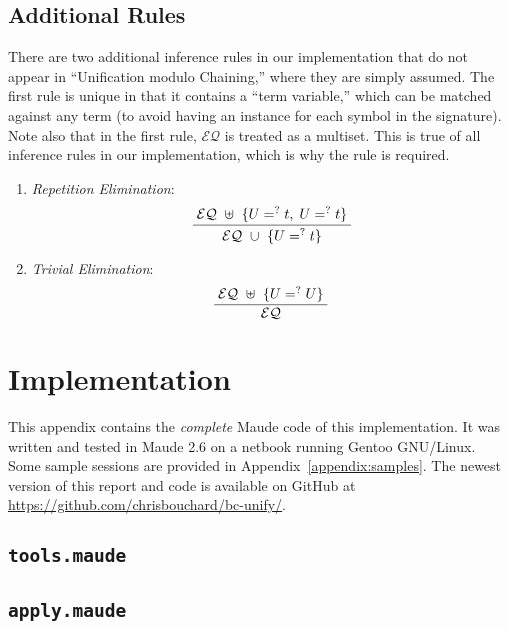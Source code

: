 \documentclass[11pt,twoside,titlepage]{article}
\newcommand{\ueq}{=_{}^?}
\newcommand{\EQ}{\mathcal{EQ}}
\newcommand{\TitleListing}[1]{\texorpdfstring{\lstinline|#1|}{#1}}
\begin{document}
\subsection{Additional Rules}

There are two additional inference rules in our implementation that do not
appear in ``Unification modulo Chaining,'' where they are simply assumed. The
first rule is unique in that it contains a ``term variable,'' which can be
matched against any term (to avoid having an instance for each symbol in the
signature). Note also that in the first rule, $\EQ$ is treated as a multiset.
This is true of all inference rules in our implementation, which is why the
rule is required.
\begin{enumerate}[(L{1}.a), align=left, font=\bfseries, start=2]
    \item \emph{Repetition Elimination}:
        \[\infer
            {\; \EQ ~ \cup ~ \{U \ueq t\} \;}
            {\; \EQ ~ \uplus ~ \{U \ueq t, \; U \ueq t\} \;}
        \]

    \item \emph{Trivial Elimination}:
        \[\infer
            {\; \EQ \;}
            {\; \EQ ~ \uplus ~ \{U \ueq U\} \;}
        \]
\end{enumerate}

\newpage
\section{Implementation}\label{appendix:implementation}

This appendix contains the \emph{complete} Maude code of this implementation.
It was written and tested in Maude 2.6 on a netbook running Gentoo GNU/Linux.
Some sample sessions are provided in Appendix~\ref{appendix:samples}. The
newest version of this report and code is available on GitHub at
\url{https://github.com/chrisbouchard/bc-unify/}.

\subsection{\TitleListing{tools.maude}}
\label{subappendix:tools-mod}

\clearpage

\subsection{\TitleListing{apply.maude}}
\label{subappendix:apply-mod}

\clearpage
\end{document}
